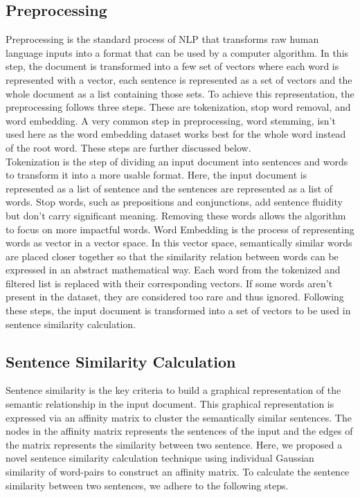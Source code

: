 \documentclass[acmlarge]{acmart}
\begin{document}
\subsection{Preprocessing}\label{subsec:preprocessing}
Preprocessing is the standard process of NLP that transforms raw human language inputs into a format that can be used by a computer algorithm. In this step, the document is transformed into a few set of vectors where each word is represented with a vector, each sentence is represented as a set of vectors and the whole document as a list containing those sets. To achieve this representation, the preprocessing follows three steps. These are tokenization, stop word removal, and word embedding. A very common step in preprocessing, word stemming, isn't used here as the word embedding dataset works best for the whole word instead of the root word. These steps are further discussed below.\\

Tokenization is the step of dividing an input document into sentences and words to transform it into a more usable format. Here, the input document is represented as a list of sentence and the sentences are represented as a list of words. Stop words, such as prepositions and conjunctions, add sentence fluidity but don’t carry significant meaning. Removing these words allows the algorithm to focus on more impactful words. 
Word Embedding is the process of representing words as vector in a vector space. In this vector space, semantically similar words are placed closer together so that the similarity relation between words can be expressed in an abstract mathematical way. 
Each word from the tokenized and filtered list is replaced with their corresponding vectors. If some words aren't present in the dataset, they are considered too rare and thus ignored. Following these steps, the input document is transformed into a set of vectors to be used in sentence similarity calculation. 

\subsection{Sentence Similarity Calculation}\label{subsec:sentence-similarity-calculation}
Sentence similarity is the key criteria to build a graphical representation of the semantic relationship in the input document. This graphical representation is expressed via an affinity matrix to cluster the semantically similar sentences. The nodes in the affinity matrix represents the sentences of the input and the edges of the matrix represents the similarity between two sentence. Here, we proposed a novel sentence similarity calculation technique using individual Gaussian similarity of word-pairs to construct an affinity matrix. To calculate the sentence similarity between two sentences, we adhere to the following steps.\\
\end{document}
